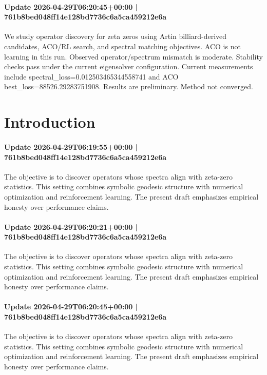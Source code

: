 \documentclass{article}
\begin{document}
\paragraph{Update 2026-04-29T06:20:45+00:00 | 761b8bed048ff14e128bd7736c6a5ca459212e6a}

We study operator discovery for zeta zeros using Artin billiard-derived candidates, ACO/RL search, and spectral matching objectives. ACO is not learning in this run. Observed operator/spectrum mismatch is moderate. Stability checks pass under the current eigensolver configuration. Current measurements include spectral\_loss=0.012503465344558741 and ACO best\_loss=88526.29283751908. Results are preliminary. Method not converged.

\section{Introduction}
\paragraph{Update 2026-04-29T06:19:55+00:00 | 761b8bed048ff14e128bd7736c6a5ca459212e6a}

The objective is to discover operators whose spectra align with zeta-zero statistics. This setting combines symbolic geodesic structure with numerical optimization and reinforcement learning. The present draft emphasizes empirical honesty over performance claims.

\paragraph{Update 2026-04-29T06:20:21+00:00 | 761b8bed048ff14e128bd7736c6a5ca459212e6a}

The objective is to discover operators whose spectra align with zeta-zero statistics. This setting combines symbolic geodesic structure with numerical optimization and reinforcement learning. The present draft emphasizes empirical honesty over performance claims.

\paragraph{Update 2026-04-29T06:20:45+00:00 | 761b8bed048ff14e128bd7736c6a5ca459212e6a}

The objective is to discover operators whose spectra align with zeta-zero statistics. This setting combines symbolic geodesic structure with numerical optimization and reinforcement learning. The present draft emphasizes empirical honesty over performance claims.
\end{document}
